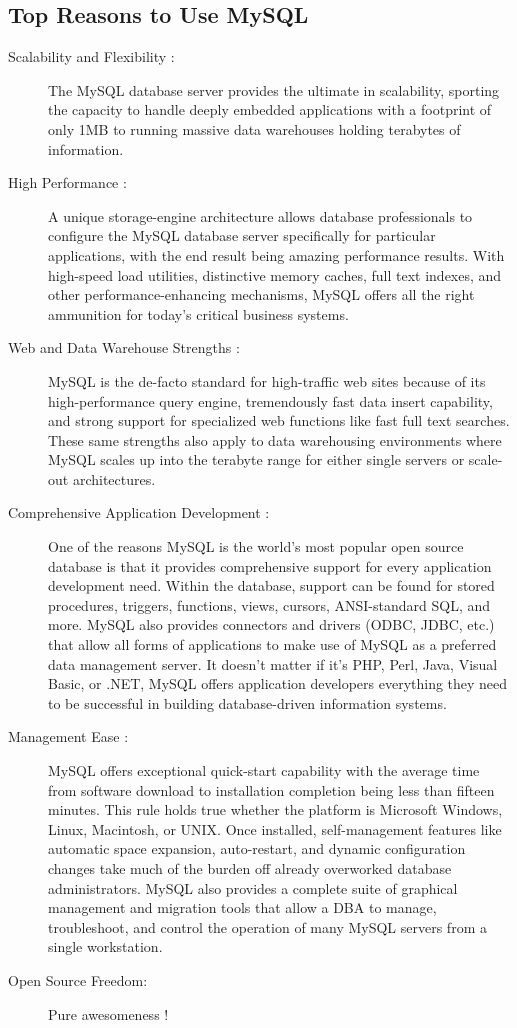 \subsection{Top Reasons to Use MySQL}

\begin{description}
\item[Scalability and Flexibility :] 
The MySQL database server provides the ultimate in scalability, sporting the
capacity to handle deeply embedded applications with a footprint of only 1MB to
running massive data warehouses holding terabytes of information.

\item[High Performance :] A unique
storage-engine architecture allows database professionals to configure the MySQL
database server specifically for particular applications, with the end result
being amazing performance results. With high-speed load utilities, distinctive
memory caches, full text indexes, and other performance-enhancing mechanisms,
MySQL offers all the right ammunition for today's critical business systems.

\item[Web and Data Warehouse Strengths :] MySQL is the de-facto standard for high-traffic web sites because of
its high-performance query engine, tremendously fast data insert capability, and
strong support for specialized web functions like fast full text searches. These
same strengths also apply to data warehousing environments where MySQL scales up
into the terabyte range for either single servers or scale-out architectures.

\item[Comprehensive Application Development
:] One of the reasons MySQL is the world's
most popular open source database is that it provides comprehensive support for
every application development need. Within the database, support can be found for
stored procedures, triggers, functions, views, cursors, ANSI-standard SQL, and
more. MySQL also provides connectors and drivers (ODBC, JDBC, etc.) that allow
all forms of applications to make use of MySQL as a preferred data management
server. It doesn't matter if it's PHP, Perl, Java, Visual Basic, or .NET, MySQL
offers application developers everything they need to be successful in building
database-driven information systems.

\item[Management Ease :] MySQL offers
exceptional quick-start capability with the average time from software download
to installation completion being less than fifteen minutes. This rule holds true
whether the platform is Microsoft Windows, Linux, Macintosh, or UNIX. Once
installed, self-management features like automatic space expansion, auto-restart,
and dynamic configuration changes take much of the burden off already overworked
database administrators. MySQL also provides a complete suite of graphical
management and migration tools that allow a DBA to manage, troubleshoot, and
control the operation of many MySQL servers from a single workstation.

\item[Open Source Freedom:]
Pure awesomeness !
\end{description}
